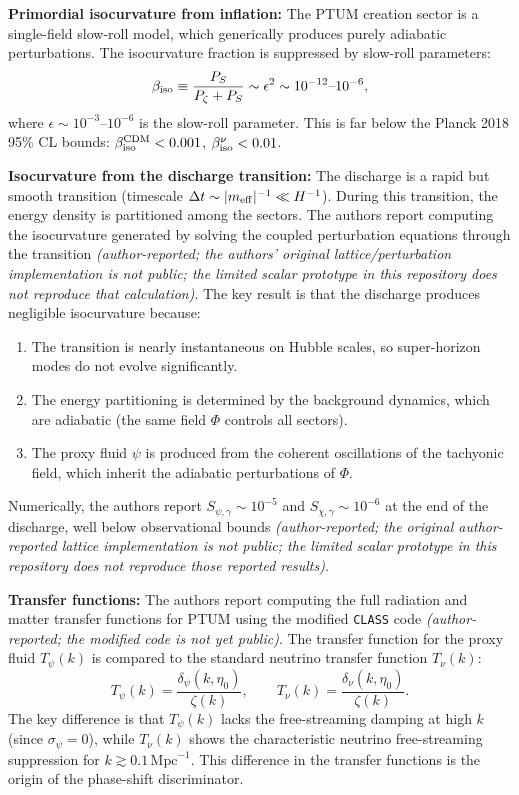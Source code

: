\documentclass[epj]{svjour}
\begin{document}
\textbf{Primordial isocurvature from inflation:} The PTUM creation
sector is a single-field slow-roll model, which generically
produces purely adiabatic perturbations. The isocurvature fraction
is suppressed by slow-roll parameters:
\begin{equation}
\beta_{\rm iso} \equiv \frac{P_{S}}{P_{\zeta}+P_{S}}
\sim \epsilon^2 \sim 10^{-12}\text{--}10^{-6},
\end{equation}
where \(\epsilon \sim 10^{-3}\)--\(10^{-6}\) is the slow-roll
parameter. This is far below the Planck 2018 95\% CL bounds:
\(\beta_{\rm iso}^{\rm CDM} < 0.001\), \(\beta_{\rm iso}^{\nu} < 0.01\).

\textbf{Isocurvature from the discharge transition:} The discharge
is a rapid but smooth transition (timescale \(\Delta t \sim
|m_{\rm eff}|^{-1} \ll H^{-1}\)). During this transition, the
energy density is partitioned among the sectors. The authors report
computing the isocurvature generated by solving the coupled
perturbation equations through the transition \emph{(author-reported;
the authors' original lattice/perturbation implementation is not public; the limited scalar prototype in this repository does not reproduce that calculation)}. The key result is
that the discharge
produces negligible isocurvature because:
\begin{enumerate}
\item The transition is nearly instantaneous on Hubble scales,
      so super-horizon modes do not evolve significantly.
\item The energy partitioning is determined by the background
      dynamics, which are adiabatic (the same field \(\Phi\)
      controls all sectors).
\item The proxy fluid \(\psi\) is produced from the coherent
      oscillations of the tachyonic field, which inherit the
      adiabatic perturbations of \(\Phi\).
\end{enumerate}
Numerically, the authors report \(S_{\psi,\gamma} \sim 10^{-5}\) and
\(S_{\chi,\gamma} \sim 10^{-6}\) at the end of the discharge, well
below observational bounds \emph{(author-reported; the original author-reported lattice implementation is not public; the limited scalar prototype in this repository does not reproduce those reported results)}.

\textbf{Transfer functions:} The authors report computing the full
radiation and matter transfer functions for PTUM using the modified
\texttt{CLASS} code \emph{(author-reported; the modified code is not
yet public)}. The transfer function for the proxy fluid
\(T_\psi(k)\) is compared to the standard neutrino transfer
function \(T_\nu(k)\):
\begin{equation}
T_\psi(k) = \frac{\delta_\psi(k,\eta_0)}{\zeta(k)},
\qquad
T_\nu(k) = \frac{\delta_\nu(k,\eta_0)}{\zeta(k)}.
\end{equation}
The key difference is that \(T_\psi(k)\) lacks the free-streaming
damping at high \(k\) (since \(\sigma_\psi=0\)), while \(T_\nu(k)\)
shows the characteristic neutrino free-streaming suppression for
\(k \gtrsim 0.1\,\mathrm{Mpc}^{-1}\). This difference in the
transfer functions is the origin of the phase-shift discriminator.
\end{document}
